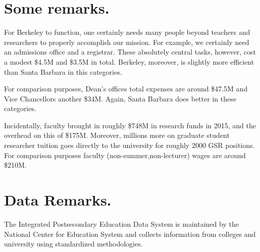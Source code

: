 \documentclass{article}
\begin{document}
\section{Some remarks.}

For Berkeley to function, one certainly needs many people beyond
teachers and researchers to properly accomplish our mission. For
example, we certainly need an admissions office and a registrar. These
absolutely central tasks, however, cost a modest \$4.5M and \$3.5M in total.
Berkeley, moreover, is slightly more efficient than Santa Barbara in this
categories.

For comparison purposes, Dean's offices total expenses are around
\$47.5M and Vice Chancellors another \$34M.  Again, Santa Barbara does
better in these categories.

Incidentally, faculty brought in roughly \$748M in research funds in
2015, and the overhead on this of \$175M.  Moreover, millions more on
graduate student researcher tuition goes directly to the university
for roughly 2000 GSR positions.  For comparison purposes faculty
(non-summer,non-lecturer) wages are around \$210M.

\section{Data Remarks.}

The Integrated Postsecondary Education Data System is maintained by
the National Center for Education System and collects information from
colleges and university using standardized methodologies.



\end{document}
